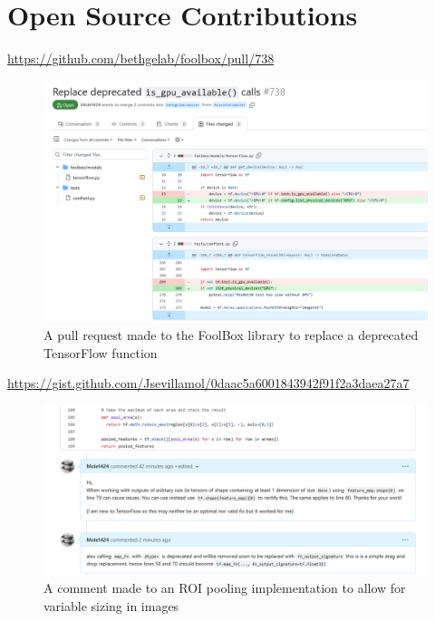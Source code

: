 \chapter{Open Source Contributions}
\label{ch:open-source}

\url{https://github.com/bethgelab/foolbox/pull/738}

\begin{figure}[h]
    \centering
    \includegraphics[width=\linewidth]{dissertation//figures/pull-request.png}
    \caption{A pull request made to the FoolBox\cite{rauber2017foolbox}\cite{rauber2017foolboxnative} library to replace a deprecated TensorFlow function}
\end{figure}

\url{https://gist.github.com/Jsevillamol/0daac5a6001843942f91f2a3daea27a7}

\begin{figure}[h]
    \centering
    \includegraphics[width=1\linewidth]{dissertation//figures/comment.png}
    \caption{A comment made to an ROI pooling implementation to allow for variable sizing in images}
\end{figure}